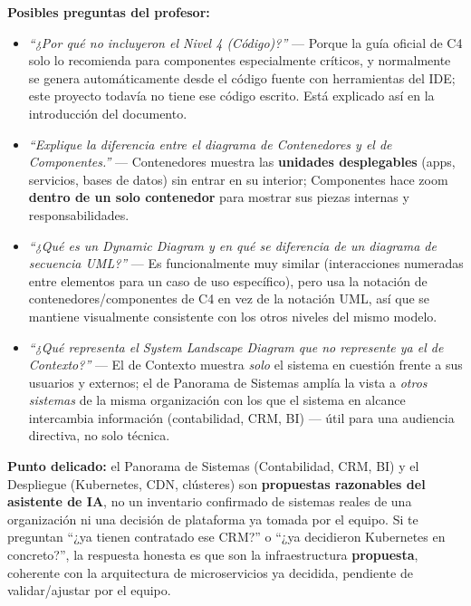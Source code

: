 \documentclass[12pt,a4paper]{article}
\begin{document}
\begin{pregunta}
\textbf{Posibles preguntas del profesor:}
\begin{itemize}
\item \textit{``¿Por qué no incluyeron el Nivel 4 (Código)?''} --- Porque la guía oficial de C4
solo lo recomienda para componentes especialmente críticos, y normalmente se genera automáticamente
desde el código fuente con herramientas del IDE; este proyecto todavía no tiene ese código escrito.
Está explicado así en la introducción del documento.
\item \textit{``Explique la diferencia entre el diagrama de Contenedores y el de Componentes.''}
--- Contenedores muestra las \textbf{unidades desplegables} (apps, servicios, bases de datos) sin
entrar en su interior; Componentes hace zoom \textbf{dentro de un solo contenedor} para mostrar sus
piezas internas y responsabilidades.
\item \textit{``¿Qué es un Dynamic Diagram y en qué se diferencia de un diagrama de secuencia
UML?''} --- Es funcionalmente muy similar (interacciones numeradas entre elementos para un caso de
uso específico), pero usa la notación de contenedores/componentes de C4 en vez de la notación UML,
así que se mantiene visualmente consistente con los otros niveles del mismo modelo.
\item \textit{``¿Qué representa el System Landscape Diagram que no represente ya el de Contexto?''}
--- El de Contexto muestra \emph{solo} el sistema en cuestión frente a sus usuarios y externos; el
de Panorama de Sistemas amplía la vista a \emph{otros sistemas} de la misma organización con los
que el sistema en alcance intercambia información (contabilidad, CRM, BI) --- útil para una
audiencia directiva, no solo técnica.
\end{itemize}
\end{pregunta}

\begin{alerta}
\textbf{Punto delicado:} el Panorama de Sistemas (Contabilidad, CRM, BI) y el Despliegue
(Kubernetes, CDN, clústeres) son \textbf{propuestas razonables del asistente de IA}, no un
inventario confirmado de sistemas reales de una organización ni una decisión de plataforma ya
tomada por el equipo. Si te preguntan ``¿ya tienen contratado ese CRM?'' o ``¿ya decidieron
Kubernetes en concreto?'', la respuesta honesta es que son la infraestructura \textbf{propuesta},
coherente con la arquitectura de microservicios ya decidida, pendiente de validar/ajustar por el
equipo.
\end{alerta}
\end{document}
